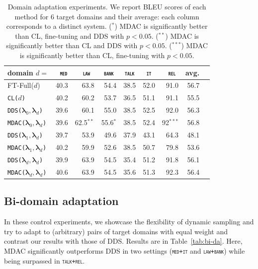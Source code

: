 \documentclass[11pt]{article}
\newcommand{\domain}[1]{\texttt{\textsc{#1}}}
\newcommand{\system}[1]{\texttt{{#1}}}
\newcommand{\vlambda}{\ensuremath{\boldsymbol\lambda}\xspace} %
\begin{document}
\begin{table}[htbp]
  \centering \small
  \begin{tabular}{|l|*8{r|}} \hline
    domain \hfill $d=$ & \multicolumn{1}{c|}{\domain{ med}} & \multicolumn{1}{c|}{\domain{ law}} & \multicolumn{1}{c|}{\domain{bank}} & \multicolumn{1}{c|}{\domain{talk}} & \multicolumn{1}{c|}{\domain{ it }} & \multicolumn{1}{c|}{\domain{ rel}} & \multicolumn{1}{c|}{avg.} \\ \hline
    FT-Full($d$) &40.3&63.8&54.4&38.5&52.0&91.0&56.7\\ \hline
    \hline
    \system{CL($d$)} &40.2&60.2&53.7&36.5&51.1&91.1&55.5\\ \hline
    \system{DDS($\vlambda_0, \vlambda_d$)} &39.6&60.1&55.0&38.5&52.5&92.0&56.3\\
    \system{MDAC($\vlambda_0, \vlambda_d$)} &39.6&62.5$^{**}$&55.6$^{*}$&38.5&52.4&92$^{***}$&56.8\\
     \hline
    \system{DDS($\vlambda_1, \vlambda_d$)} &39.7&53.9&49.6&37.9&43.1&64.3&48.1\\
    \system{MDAC($\vlambda_1, \vlambda_d$)} &40.2&59.9&52.6&38.5&50.7&79.8&53.6\\ \hline
    \system{DDS($\vlambda_d, \vlambda_d$)} &39.9&63.9&54.5&35.4&51.2&91.8&56.1\\
    \system{MDAC($\vlambda_d, \vlambda_d$)}&40.6&63.9&54.5&35.6&51.3&92.3&56.4\\
    \hline
  \end{tabular}
  \caption{Domain adaptation experiments. We report BLEU scores of each method for 6 target domains and their average: each column corresponds to a distinct system. ($^{*}$) MDAC is significantly better than CL, fine-tuning and DDS with $p<0.05$. ($^{**}$) MDAC is significantly better than CL and DDS with $p<0.05$. ($^{***}$) MDAC is significantly better than CL, fine-tuning with $p<0.05$.}
  \label{tab:da}
\end{table}

\subsection{Bi-domain adaptation}\label{ssec:bida}

In these control experiments, we showcase the flexibility of dynamic sampling and try to adapt to (arbitrary) pairs of target domains with equal weight and contrast our results with those of DDS. Results are in Table~\ref{tab:bi-da}. Here, MDAC significantly outperforms DDS in two settings (\domain{med+it} and \domain{law+bank}) while being surpassed in \domain{talk+rel}.
\end{document}
